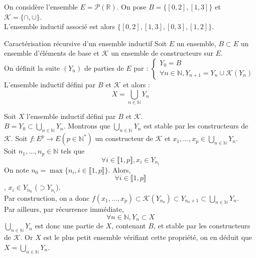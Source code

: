         \begin{exemple}{6.41}{}
            \item On considère l'ensemble $E = \mathcal{P}(\mathbb{R})$. On pose $B = \{[0,2],[1,3]\}$ et $\mathcal{K} = \{\cap, \cup \}$. \\ L'ensemble inductif associé est alors $\{[0,2], [1,3], [0,3], [1,2]\}$.
        \end{exemple}

        \begin{proposition}{6.42}{Caractérisation récursive d'un ensemble inductif}
            Soit $E$ un ensemble, $B \subset E$ un ensemble d'éléments de base et $\mathcal{K}$ un ensemble de constructeurs sur $E$. \\ On définit la suite $(Y_n)$ de parties de $E$ par : 
            $\begin{cases}
                Y_0 = B \\
                \forall n \in \mathbb{N}, Y_{n+1} = Y_n \cup \mathcal{K}(Y_n)
            \end{cases}$ \\
            L'ensemble inductif défini par $B$ et $\mathcal{K}$ et alors : $$X = \bigcup_{n \in \mathbb{N}}Y_n$$
        \end{proposition}

        \begin{demonstration}
            Soit $X$ l'ensemble inductif défini par $B$ et $\mathcal{K}$. \\ $B = Y_0 \subset \bigcup_{n \in \mathbb{N}}Y_n$. Montrons que $\bigcup_{n \in \mathbb{N}}Y_n$ est stable par les constructeurs de $\mathcal{K}$. Soit $f:E^p \rightarrow E (p \in \mathbb{N}^*)$ un constructeur de $\mathcal{K}$ et $x_1, \ldots, x_p \in \bigcup_{n \in \mathbb{N}}Y_n$. \\ Soit $n_1, \ldots, n_p \in \mathbb{N}$ tels que $$\forall i \in \llbracket 1,p \rrbracket, x_i \in Y_{n_i} $$ On note $n_0 = \max\{n_i, i \in \llbracket 1,p \rrbracket\}$. Alors, $$\forall i \in \llbracket 1,p \rrbracket$$, $x_i \in Y_{n_0}$ ($\supset Y_{n_i}$). \\ Par construction, on a donc $f(x_1,\ldots,x_p) \subset \mathcal{K}(Y_{n_0}) \subset Y_{n_0 + 1} \subset \bigcup_{n \in \mathbb{N}}Y_n$.\\ Par ailleurs, par récurrence immédiate, $$\forall n \in \mathbb{N}, Y_n \subset X$$ $\bigcup_{n \in \mathbb{N}}Y_n$ est donc une partie de $X$, contenant $B$, et stable par les constructeurs de $\mathcal{K}$. Or $X$ est le plus petit ensemble vérifiant cette propriété, on en déduit que $X = \bigcup_{n \in \mathbb{N}}Y_n$.
        \end{demonstration}

